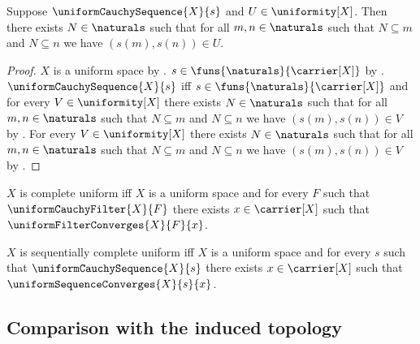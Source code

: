 \begin{proposition}\label{uniform_cauchy_sequence_entourage}
    Suppose $\uniformCauchySequence{X}{s}$ and $U\in\uniformity[X]$.
    Then there exists $N\in\naturals$ such that for all
        $m,n\in\naturals$ such that $N\subseteq m$ and $N\subseteq n$
        we have $(s(m),s(n))\in U$.
\end{proposition}
\begin{proof}
    $X$ is a uniform space by .
    $s\in\funs{\naturals}{\carrier[X]}$ by
        .
    $\uniformCauchySequence{X}{s}$ iff
        $s\in\funs{\naturals}{\carrier[X]}$ and for every
            $V\in\uniformity[X]$ there exists $N\in\naturals$ such that for
            all $m,n\in\naturals$ such that $N\subseteq m$ and
            $N\subseteq n$ we have $(s(m),s(n))\in V$ by
        .
    For every $V\in\uniformity[X]$ there exists $N\in\naturals$ such that
        for all $m,n\in\naturals$ such that $N\subseteq m$ and
        $N\subseteq n$ we have $(s(m),s(n))\in V$ by \auto.
\end{proof}

\begin{definition}\label{complete_uniform_space}
    $X$ is complete uniform iff
        $X$ is a uniform space and
        for every $F$ such that $\uniformCauchyFilter{X}{F}$ there exists
            $x\in\carrier[X]$ such that
                $\uniformFilterConverges{X}{F}{x}$.
\end{definition}

\begin{definition}\label{sequentially_complete_uniform_space}
    $X$ is sequentially complete uniform iff
        $X$ is a uniform space and
        for every $s$ such that $\uniformCauchySequence{X}{s}$ there exists
            $x\in\carrier[X]$ such that
                $\uniformSequenceConverges{X}{s}{x}$.
\end{definition}

\subsection{Comparison with the induced topology}

